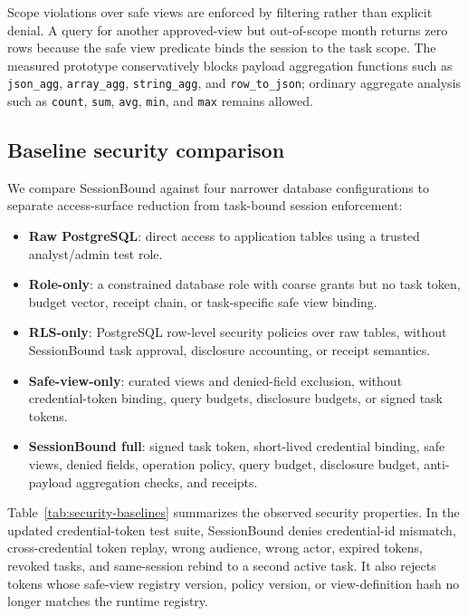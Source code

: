 \documentclass[journal]{IEEEtran}
\providecommand{\tightlist}{%
  \setlength{\itemsep}{0pt}\setlength{\parskip}{0pt}}
\begin{document}
Scope violations over safe views are enforced by filtering rather than
explicit denial. A query for another approved-view but out-of-scope
month returns zero rows because the safe view predicate binds the
session to the task scope. The measured prototype conservatively blocks
payload aggregation functions such as \texttt{json\_agg},
\texttt{array\_agg}, \texttt{string\_agg}, and \texttt{row\_to\_json};
ordinary aggregate analysis such as \texttt{count}, \texttt{sum},
\texttt{avg}, \texttt{min}, and \texttt{max} remains allowed.

\hypertarget{baseline-security-comparison}{%
\subsection{Baseline security comparison}\label{baseline-security-comparison}}

We compare SessionBound against four narrower database configurations to
separate access-surface reduction from task-bound session enforcement:

\begin{itemize}
\tightlist
\item
  \textbf{Raw PostgreSQL}: direct access to application tables using a
  trusted analyst/admin test role.
\item
  \textbf{Role-only}: a constrained database role with coarse grants but
  no task token, budget vector, receipt chain, or task-specific safe
  view binding.
\item
  \textbf{RLS-only}: PostgreSQL row-level security policies over raw
  tables, without SessionBound task approval, disclosure accounting, or
  receipt semantics.
\item
  \textbf{Safe-view-only}: curated views and denied-field exclusion,
  without credential-token binding, query budgets, disclosure budgets,
  or signed task tokens.
\item
  \textbf{SessionBound full}: signed task token, short-lived credential
  binding, safe views, denied fields, operation policy, query budget,
  disclosure budget, anti-payload aggregation checks, and receipts.
\end{itemize}

Table~\ref{tab:security-baselines} summarizes the observed security
properties. In the updated credential-token test suite, SessionBound
denies credential-id mismatch, cross-credential token replay, wrong
audience, wrong actor, expired tokens, revoked tasks, and same-session
rebind to a second active task. It also rejects tokens whose safe-view
registry version, policy version, or view-definition hash no longer
matches the runtime registry.
\end{document}
